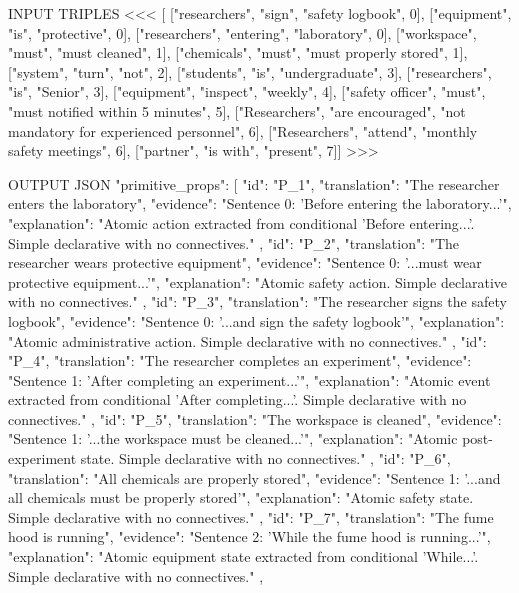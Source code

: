 INPUT TRIPLES
<<<
[ ["researchers", "sign", "safety logbook", 0],
  ["equipment", "is", "protective", 0],
  ["researchers", "entering", "laboratory", 0],
  ["workspace", "must", "must cleaned", 1],
  ["chemicals", "must", "must properly stored", 1],
  ["system", "turn", "not", 2],
  ["students", "is", "undergraduate", 3],
  ["researchers", "is", "Senior", 3],
  ["equipment", "inspect", "weekly", 4],
  ["safety officer", "must", "must notified within 5 minutes", 5],
  ["Researchers", "are encouraged", "not mandatory for experienced personnel", 6],
  ["Researchers", "attend", "monthly safety meetings", 6],
  ["partner", "is with", "present", 7]]
>>>

OUTPUT JSON
{
  "primitive_props": [
    {
      "id": "P_1",
      "translation": "The researcher enters the laboratory",
      "evidence": "Sentence 0: 'Before entering the laboratory...'",
      "explanation": "Atomic action extracted from conditional 'Before entering...'. Simple declarative with no connectives."
    },
    {
      "id": "P_2",
      "translation": "The researcher wears protective equipment",
      "evidence": "Sentence 0: '...must wear protective equipment...'",
      "explanation": "Atomic safety action. Simple declarative with no connectives."
    },
    {
      "id": "P_3",
      "translation": "The researcher signs the safety logbook",
      "evidence": "Sentence 0: '...and sign the safety logbook'",
      "explanation": "Atomic administrative action. Simple declarative with no connectives."
    },
    {
      "id": "P_4",
      "translation": "The researcher completes an experiment",
      "evidence": "Sentence 1: 'After completing an experiment...'",
      "explanation": "Atomic event extracted from conditional 'After completing...'. Simple declarative with no connectives."
    },
    {
      "id": "P_5",
      "translation": "The workspace is cleaned",
      "evidence": "Sentence 1: '...the workspace must be cleaned...'",
      "explanation": "Atomic post-experiment state. Simple declarative with no connectives."
    },
    {
      "id": "P_6",
      "translation": "All chemicals are properly stored",
      "evidence": "Sentence 1: '...and all chemicals must be properly stored'",
      "explanation": "Atomic safety state. Simple declarative with no connectives."
    },
    {
      "id": "P_7",
      "translation": "The fume hood is running",
      "evidence": "Sentence 2: 'While the fume hood is running...'",
      "explanation": "Atomic equipment state extracted from conditional 'While...'. Simple declarative with no connectives."
    },
    {
}}

